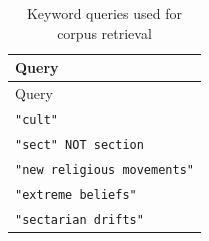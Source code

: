 \begin{longtable}{@{}p{10cm}@{}}
\caption{Keyword queries used for corpus retrieval}\label{tab:keyword_queries_corpus} \\
\toprule
Query \\
\midrule
\endfirsthead
\toprule
Query \\
\midrule
\endhead
\bottomrule
\endfoot
\texttt{"cult"} \\
\texttt{"sect" NOT section} \\
\texttt{"new religious movements"} \\
\texttt{"extreme beliefs"} \\
\texttt{"sectarian drifts"} \\
\end{longtable}
